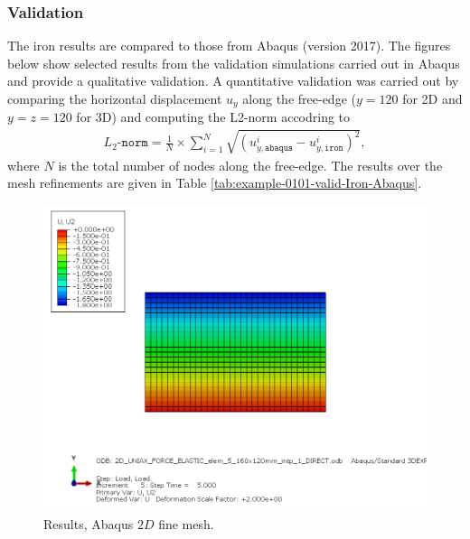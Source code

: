 \subsubsection{Validation}
%
The iron results are compared to those from Abaqus (version 2017). The figures below show selected results from the validation simulations carried out in Abaqus and provide a qualitative validation. A quantitative validation was carried out by comparing the horizontal displacement $u_y$ along the free-edge ($y=120$ for 2D and $y=z=120$ for 3D) and computing the L2-norm accodring to
\begin{align}
    L_2\texttt{-norm} = \frac{1}{N} \times  \sum_{i=1}^{N} \sqrt{\left(u_{y,\texttt{abaqus}}^i-u_{y,\texttt{iron}}^i  \right)^2},
\end{align}
where $N$ is the total number of nodes along the free-edge. The results over the mesh refinements are given in Table \ref{tab:example-0101-valid-Iron-Abaqus}.
%
\begin{figure}[h!]
    \centering 
    \includegraphics[width=\columnwidth]{examples/example-0111/doc/figures/2D_UNIAX_FORCE_ELASTIC_elem_5_160x120mm_intp_1_DIRECTU2.png} 
    \caption{Results, Abaqus $2D$ fine mesh.}
    \label{example-0101-abaqus-2D-fig}
\end{figure}
%
